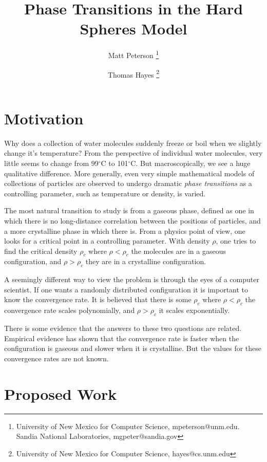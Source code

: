 \documentclass[a4paper,11pt]{article}
\title{Phase Transitions in the Hard Spheres Model}
\author{Matt Peterson \thanks{University of New Mexico for Computer Science, mpeterson@unm.edu. Sandia National Laboratories, mgpeter@sandia.gov} \and Thomas Hayes \thanks{University of New Mexico for Computer Science, hayes@cs.unm.edu}}
\begin{document}
\maketitle

\section*{Motivation}

Why does a collection of water molecules suddenly freeze or boil when we slightly change it's temperature?  From the perspective of individual water molecules, very little seems to change from 99$^\circ$C to 101$^\circ$C.  But macroscopically, we see a huge qualitative difference.  More generally, even very simple mathematical models of collections of particles are observed to undergo dramatic \textit{phase transitions} as a controlling parameter, such as temperature or density, is varied.

The most natural transition to study is from a gaseous phase, defined as one in which there is no long-distance correlation between the positions of particles, and a more crystalline phase in which there is.  From a physics point of view, one looks for a critical point in a controlling parameter.  With density $\rho$, one tries to find the critical density $\rho_c$ where $\rho < \rho_c$ the molecules are in a gaseous configuration, and $\rho > \rho_c$ they are in a crystalline configuration.

A seemingly different way to view the problem is through the eyes of a computer scientist.  If one wants a randomly distributed configuration it is important to know the convergence rate.  It is believed that there is some $\rho_c$ where $\rho < \rho_c$ the convergence rate scales polynomially, and $\rho > \rho_c$ it scales exponentially.

There is some evidence that the answers to these two questions are related.  Empirical evidence has shown that the convergence rate is faster when the configuration is gaseous and slower when it is crystalline.  But the values for these convergence rates are not known.

\section*{Proposed Work}

\end{document}
